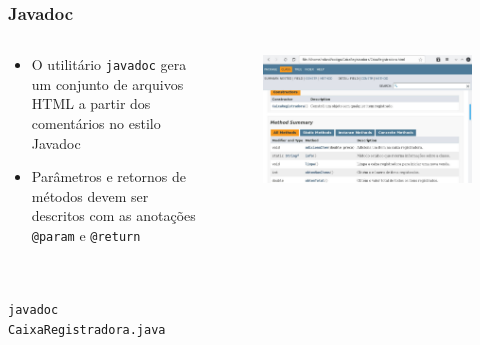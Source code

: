 \documentclass[xcolor={dvipsnames,table},aspectratio=169]{beamer}
\begin{document}
\begin{frame}[fragile]\frametitle{Javadoc}
\begin{columns}[T]
	\begin{column}{0.35\linewidth}
\begin{itemize}
	\item O utilitário \texttt{javadoc} gera um conjunto de arquivos HTML a partir dos comentários no estilo Javadoc
	\item Parâmetros e retornos de métodos devem ser descritos com as anotações \texttt{@param} e \texttt{@return}
\end{itemize}
{\scriptsize\texttt{~\\~\\javadoc CaixaRegistradora.java}}
	\end{column}
	\begin{column}{0.65\linewidth}
\begin{figure}[h]
	\includegraphics[height=0.65\paperheight,center]{pucrs-ep-fprog-unidade_07-objetos_e_classes-laminas-javadoc.jpg}
\end{figure}
	\end{column}
\end{columns}

\end{frame}
\end{document}
